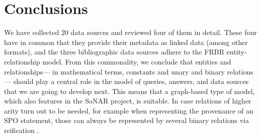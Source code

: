 %

%

\section{Conclusions}
\label{sec:implications_on_modelling}

We have collected 20 data sources and reviewed four of them in detail.
These four have in common that they provide their metadata as linked data (among other formats),
and the three bibliographic data sources adhere to the FRBR entity-relationship model.
From this commonality, we conclude that entities and relationships---%
in mathematical terms, constants and unary and binary relations---%
should play a central role in the model of queries, answers, and data sources
that we are going to develop next. This means that a graph-based type of model,
which also features in the \gls{SoNAR} project,
is suitable. In case relations of higher arity turn out to be needed,
for example when representing the  provenance of an \gls{SPO} statement,
those can always be represented by several binary relations via reification
\autocite[cf.][p.339f.]{Doan2012}.

